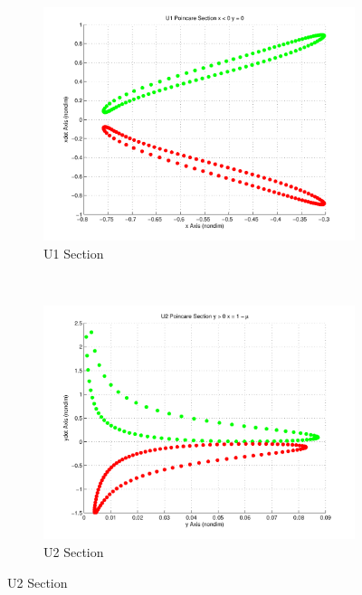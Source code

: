 \begin{figure}
     \centering
        \begin{subfigure}[b]{0.25\textwidth}
                \includegraphics[width=\columnwidth]{figures/2015_AAS/U1_poincare}
                \caption{U1 Section}
                \label{fig:u1_poincare}
        \end{subfigure}%
        ~%
        \begin{subfigure}[b]{0.25\textwidth}
                \includegraphics[width=\columnwidth]{figures/2015_AAS/U2_poincare}
                \caption{U2 Section}

\end{subfigure}
\end{figure}
